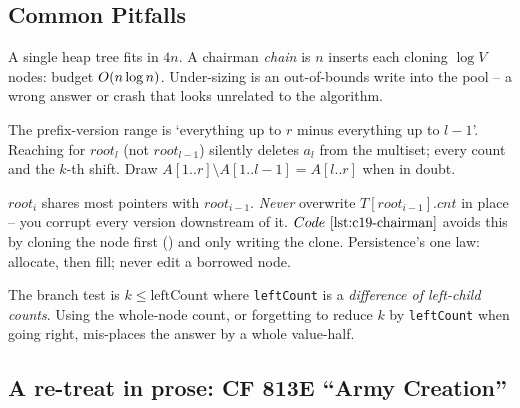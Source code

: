 \subsection{Common Pitfalls}

\begin{warningbox}
A single heap tree fits in \(4n\). A chairman \emph{chain} is \(n\) inserts each cloning \(\log V\) nodes: budget \(O(n\log n)\). Under-sizing is an out-of-bounds write into the pool -- a wrong answer or crash that looks unrelated to the algorithm.
\end{warningbox}

\begin{warningbox}
The prefix-version range is `everything up to \(r\) minus everything up to \(l-1\)'. Reaching for \(\mathit{root}_l\) (not \(\mathit{root}_{l-1}\)) silently deletes \(a_l\) from the multiset; every count and the \(k\)-th shift. Draw \(A[1..r]\setminus A[1..l-1]=A[l..r]\) when in doubt.
\end{warningbox}

\begin{warningbox}
\(\mathit{root}_i\) shares most pointers with \(\mathit{root}_{i-1}\). \emph{Never} overwrite \(T[\mathit{root}_{i-1}].\mathit{cnt}\) in place -- you corrupt every version downstream of it. \(\coderef{c19-chairman}\) avoids this by cloning the node first () and only writing the clone. Persistence's one law: allocate, then fill; never edit a borrowed node.
\end{warningbox}

\begin{warningbox}
The branch test is \(k\le\text{leftCount}\) where \texttt{leftCount} is a \emph{difference of left-child counts}. Using the whole-node count, or forgetting to reduce \(k\) by \texttt{leftCount} when going right, mis-places the answer by a whole value-half.
\end{warningbox}

\subsection{A re-treat in prose: CF 813E ``Army Creation''}


